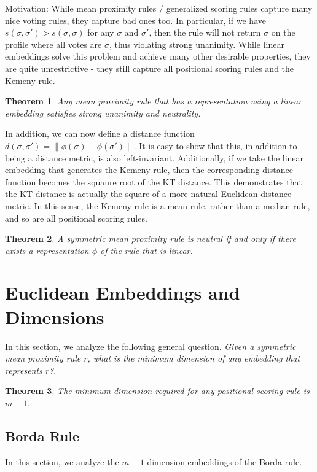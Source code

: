\documentclass[10pt,letterpaper]{article}
\newtheorem{theorem}{Theorem}
\begin{document}
Motivation: While mean proximity rules / generalized scoring rules capture many nice voting rules, they capture bad ones too. In particular, if we have $s(\sigma,\sigma') > s(\sigma,\sigma)$ for any $\sigma$ and $\sigma'$, then the rule will not return $\sigma$ on the profile where all votes are $\sigma$, thus violating strong unanimity. While linear embeddings solve this problem and achieve many other desirable properties, they are quite unrestrictive - they still capture all positional scoring rules and the Kemeny rule.

\begin{theorem}
Any mean proximity rule that has a representation using a linear embedding satisfies strong unanimity and neutrality. 
\end{theorem}

In addition, we can now define a distance function $d(\sigma,\sigma') = \|\phi(\sigma)-\phi(\sigma')\|$. It is easy to show that this, in addition to being a distance metric, is also left-invariant. Additionally, if we take the linear embedding that generates the Kemeny rule, then the corresponding distance function becomes the squaure root of the KT distance. This demonstrates that the KT distance is actually the square of a more natural Euclidean distance metric. In this sense, the Kemeny rule is a mean rule, rather than a median rule, and so are all positional scoring rules. 

\begin{theorem}
A symmetric mean proximity rule is neutral if and only if there exists a representation $\phi$ of the rule that is linear. 
\label{thm:neutrality-linear-embedding}
\end{theorem}

\section{Euclidean Embeddings and Dimensions}

In this section, we analyze the following general question. \emph{Given a symmetric mean proximity rule $r$, what is the minimum dimension of any embedding that represents $r$?}. 

\begin{theorem}
The minimum dimension required for any positional scoring rule is $m-1$. 
\end{theorem}

\subsection{Borda Rule}
In this section, we analyze the $m-1$ dimension embeddings of the Borda rule. 
\end{document}

